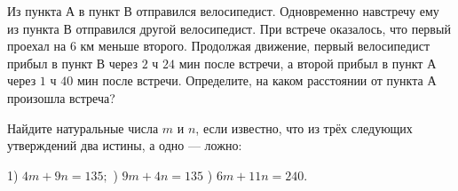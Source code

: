 Из пункта А в пункт В отправился велосипедист. Одновременно навстречу ему из пункта В отправился другой велосипедист. При встрече оказалось, что первый проехал на $6$ км меньше второго. Продолжая движение, первый велосипедист прибыл в пункт В через $2$ ч $24$ мин после встречи, а второй прибыл в пункт А через $1$ ч $40$ мин после встречи. Определите, на каком расстоянии от пункта А произошла встреча?

\newpage

\hspace{3mm}

Найдите натуральные числа $m$ и $n$, если известно, что из трёх следующих утверждений два истины, а одно --- ложно:

1) $4m+9n = 135;$ ) $9m+4n = 135$ ) $6m+11n=240.$